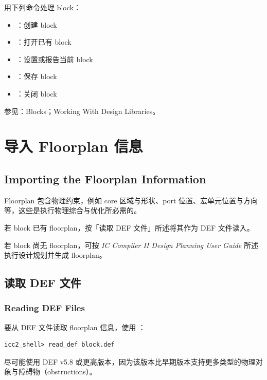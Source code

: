 用下列命令处理 block：
\begin{itemize}
  \item {}：创建 block
  \item {}：打开已有 block
  \item {}：设置或报告当前 block
  \item {}：保存 block
  \item {}：关闭 block
\end{itemize}

\begin{seeAlsoBox}
参见：Blocks；Working With Design Libraries。
\end{seeAlsoBox}

\section{导入 Floorplan 信息}
\subsection*{Importing the Floorplan Information}

Floorplan 包含物理约束，例如 core 区域与形状、port 位置、宏单元位置与方向等，这些是执行物理综合与优化所必需的。

若 block 已有 floorplan，按「读取 DEF 文件」所述将其作为 DEF 文件读入。

若 block 尚无 floorplan，可按 \textit{IC Compiler II Design Planning User Guide} 所述执行设计规划并生成 floorplan。

\subsection{读取 DEF 文件}
\subsubsection*{Reading DEF Files}

要从 DEF 文件读取 floorplan 信息，使用 ：
\begin{lstlisting}
icc2_shell> read_def block.def
\end{lstlisting}

\begin{noteBox}
尽可能使用 DEF v5.8 或更高版本，因为该版本比早期版本支持更多类型的物理对象与障碍物（obstructions）。
\end{noteBox}

